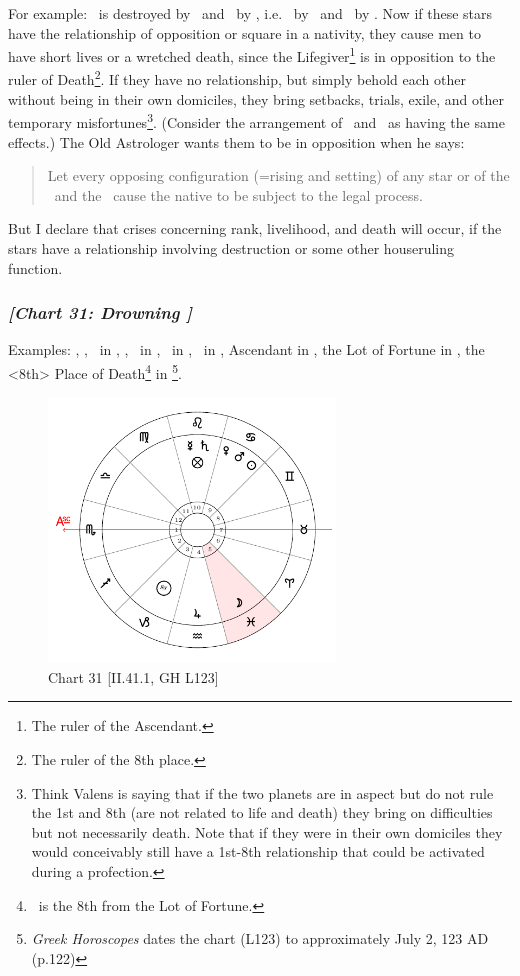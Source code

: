For example: \Gemini\, is destroyed by \Capricorn\, and \Aquarius\, by \Virgo, i.e. \Mercury\, by \Saturn\, and \Saturn\, by \Mercury. Now if these stars have the relationship of opposition or square in a nativity, they cause men to have short lives or a wretched death, since the Lifegiver\footnote{The ruler of the Ascendant.} is in opposition to the ruler of Death\footnote{The ruler of the 8th place.}. If they have no relationship, but simply  behold each other without being in their own domiciles, they bring setbacks, trials, exile, and other temporary misfortunes\footnote{Think Valens is saying that if the two planets are in aspect but do not rule the 1st and 8th (are not related to life and death) they bring on difficulties but not necessarily death.  Note that if they were in their own domiciles they would conceivably still have a 1st-8th relationship that could be activated during a profection.}. (Consider the arrangement of \Mars\, and \Mercury\, as having the same effects.) The Old Astrologer  wants them to be in opposition when he says: \begin{quote}Let every opposing configuration (=rising and setting) of any star or of the \Sun\, and the \Moon\, cause the native to be subject to the legal process.\end{quote}

But I declare that crises concerning rank, livelihood, and death will occur, if the stars have a relationship involving destruction or some other houseruling function.
\newpage
\subsubsection{\textit{[Chart 31: Drowning ]}}
Examples: \Sun, \Mars, \Venus\, in \Cancer, \Saturn, \Mercury\, in \Leo, \Jupiter\, in \Aquarius, \Moon\, in \Pisces, Ascendant in \Scorpio, the Lot of Fortune in \Leo, the <8th> Place of Death\footnote{\Pisces\, is the 8th from the Lot of Fortune.} in \Pisces\footnote{\textit{Greek Horoscopes} dates the chart (L123) to approximately July 2, 123 AD (p.122)}.

\clearpage
\begin{figure}
\centering
\includegraphics[width=0.68\textwidth]{charts/2_41_1}
\caption{Chart 31 [II.41.1, GH L123]}
\label{fig:chart31}
\end{figure} 

